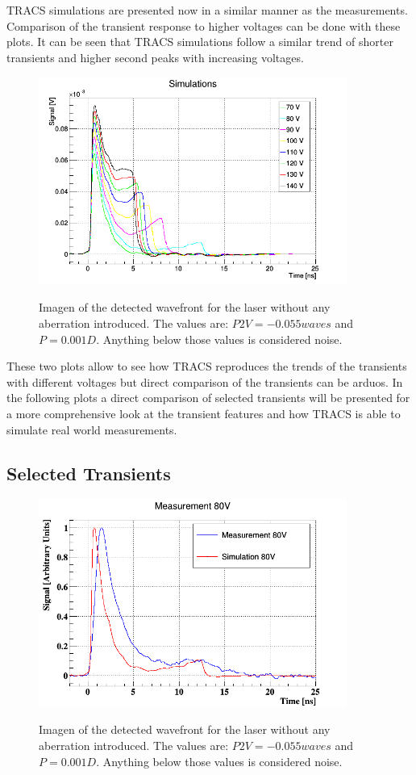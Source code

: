 TRACS simulations are presented now in a similar manner as the measurements. Comparison of the transient response to higher voltages can be done with these plots. It can be seen that TRACS simulations follow a similar trend of shorter transients and higher second peaks with increasing voltages.

\begin{figure}[h]
	\centering
	\includegraphics[width=0.9\textwidth]{AllSims.png}
	\label{fig:mues2}
	\caption{Imagen of the detected wavefront for the laser without any aberration introduced. The values are: $P2V = -0.055waves$ and $P = 0.001D$. Anything below those values is considered noise.}
\end{figure}

These two plots allow to see how TRACS reproduces the trends of the transients with different voltages but direct comparison of the transients can be arduos. In the following plots a direct comparison of selected transients will be presented for a more comprehensive look at the transient features and how TRACS is able to simulate real world measurements.

\subsection{Selected Transients}

\begin{figure}[h]
	\centering
	\includegraphics[width=0.9\textwidth]{80V.png}
	\label{fig:mues2}
	\caption{Imagen of the detected wavefront for the laser without any aberration introduced. The values are: $P2V = -0.055waves$ and $P = 0.001D$. Anything below those values is considered noise.}
\end{figure}

